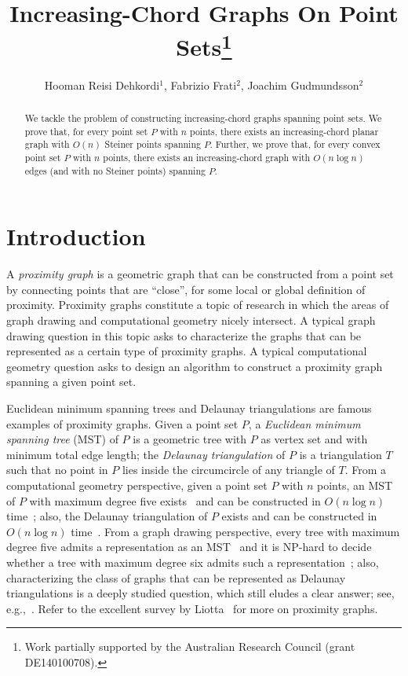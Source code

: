 \documentclass{llncs}
\title{Increasing-Chord Graphs On Point Sets\thanks{Work partially supported by the Australian Research Council (grant DE140100708).}}
\date{}
\author{Hooman Reisi Dehkordi$^1$, Fabrizio Frati$^2$, Joachim Gudmundsson$^2$
\institute{
$^1$ School of Information Technologies -- Monash University\\
\email{hooman.dehkordi@monash.edu}\\
$^2$ School of Information Technologies -- The University of Sydney\\
\email{\{fabrizio.frati,joachim.gudmundsson\}@sydney.edu.au}}}
\begin{document}
\maketitle

\begin{abstract}
We tackle the problem of constructing increasing-chord graphs spanning point sets. We prove that, for every point set $P$ with $n$ points, there exists an increasing-chord planar graph with $O(n)$ Steiner points spanning $P$. Further, we prove that, for every convex point set $P$ with $n$ points, there exists an increasing-chord graph with $O(n \log n)$ edges (and with no Steiner points) spanning $P$.
\end{abstract}

\section{Introduction} \label{se:introduction}

A {\em proximity graph} is a geometric graph that can be constructed from a point set by connecting points that are ``close'', for some local or global definition of proximity. Proximity graphs constitute a topic of research in which the areas of graph drawing and computational geometry nicely intersect. A typical graph drawing question in this topic asks to characterize the graphs that can be represented as a certain type of proximity graphs. A typical computational geometry question asks to design an algorithm to construct a proximity graph spanning a given point set.

Euclidean minimum spanning trees and Delaunay triangulations are famous examples of proximity graphs. Given a point set $P$, a {\em Euclidean minimum spanning tree} (MST) of $P$ is a geometric tree with $P$ as vertex set and with minimum total edge length; the {\em Delaunay triangulation} of $P$ is a triangulation $T$ such that no point in $P$ lies inside the circumcircle of any triangle of $T$. From a computational geometry perspective, given a point set $P$ with $n$ points, an MST of $P$ with maximum degree five exists~\cite{MonmaS92} and can be constructed in $O(n \log n)$ time~\cite{bcko-cgta-08}; also, the Delaunay triangulation of $P$ exists and can be constructed in $O(n \log n)$ time~\cite{bcko-cgta-08}. From a graph drawing perspective, every tree with maximum degree five admits a representation as an MST~\cite{MonmaS92} and it is NP-hard to decide whether a tree with maximum degree six admits such a representation~\cite{EadesW96}; also, characterizing the class of graphs that can be represented as Delaunay triangulations is a deeply studied question, which still eludes a clear answer; see, e.g.,~\cite{dv-aptg-96,ds-gtcidr-96}. Refer to the excellent survey by Liotta~\cite{gd-handbook} for more on proximity graphs.
\end{document}
